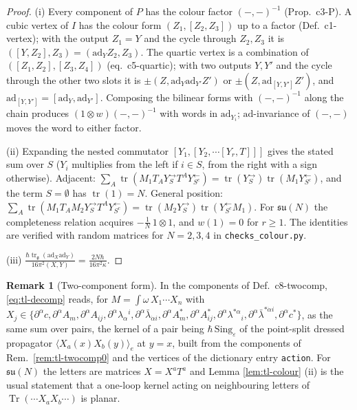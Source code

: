 \documentclass[11pt]{article}
\numberwithin{equation}{section}
\theoremstyle{plain}
\theoremstyle{definition}
\newtheorem{remark}[theorem]{Remark}
\begin{document}
\begin{proof}
(i) Every component of $P$ has the colour factor $(-,-)^{-1}$ (Prop.~c3-P). A cubic vertex of $I$ has the colour form $(Z_1,[Z_2,Z_3])$ up to a factor (Def.~c1-vertex); with the output $Z_1=Y$ and the cycle through $Z_2,Z_3$ it is $([Y,Z_2],Z_3)=(\mathrm{ad}_YZ_2,Z_3)$. The quartic vertex is a combination of $([Z_1,Z_2],[Z_3,Z_4])$ (eq.~c5-quartic); with two outputs $Y,Y'$ and the cycle through the other two slots it is $\pm(Z,\mathrm{ad}_Y\mathrm{ad}_{Y'}Z')$ or $\pm(Z,\mathrm{ad}_{[Y,Y']}Z')$, and $\mathrm{ad}_{[Y,Y']}=[\mathrm{ad}_Y,\mathrm{ad}_{Y'}]$. Composing the bilinear forms with $(-,-)^{-1}$ along the chain produces $(1\otimes w)(-,-)^{-1}$ with words in $\mathrm{ad}_{Y_i}$; $\mathrm{ad}$-invariance of $(-,-)$ moves the word to either factor.

(ii) Expanding the nested commutator $[Y_1,[Y_2,\cdots[Y_r,T]]]$ gives the stated sum over $S$ ($Y_i$ multiplies from the left if $i\in S$, from the right with a sign otherwise). Adjacent: $\sum_A\operatorname{tr}(M_1T_AY_S^{\to}T^AY_{S^c}^{\leftarrow})=\operatorname{tr}(Y_S^{\to})\operatorname{tr}(M_1Y_{S^c}^{\leftarrow})$, and the term $S=\emptyset$ has $\operatorname{tr}(1)=N$. General position: $\sum_A\operatorname{tr}(M_1T_AM_2Y_S^{\to}T^AY_{S^c}^{\leftarrow})=\operatorname{tr}(M_2Y_S^{\to})\operatorname{tr}(Y_{S^c}^{\leftarrow}M_1)$. For $\mathfrak{su}(N)$ the completeness relation acquires $-\frac1N\,1\otimes1$, and $w(1)=0$ for $r\ge1$. The identities are verified with random matrices for $N=2,3,4$ in \texttt{checks\_colour.py}.

(iii) $\frac{\hbar\operatorname{tr}_{\mathfrak g}(\mathrm{ad}_X\mathrm{ad}_Y)}{16\pi^2(X,Y)}=\frac{2N\hbar}{16\pi^2\kappa}$.
\end{proof}

\begin{remark}[Two-component form]
In the components of Def.~c8-twocomp, \eqref{eq:tl-decomp} reads, for $M=\int\omega\,X_1\cdots X_n$ with $X_j\in\{\partial^\alpha c,\partial^\alpha A_m,\partial^\alpha A_{ij},\partial^\alpha\lambda_\alpha{}^i,\partial^\alpha\bar\lambda_{\dot\alpha i},\partial^\alpha A^*_m,\partial^\alpha A^*_{ij},\partial^\alpha\lambda^{*\alpha}{}_i,\partial^\alpha\bar\lambda^{*\dot\alpha i},\partial^\alpha c^*\}$, as the same sum over pairs, the kernel of a pair being $\hbar\,\mathrm{Sing}_\varepsilon$ of the point-split dressed propagator $\langle X_a(x)X_b(y)\rangle_e$ at $y=x$, built from the components of Rem.~\ref{rem:tl-twocomp0} and the vertices of the dictionary entry \texttt{action}. For $\mathfrak{su}(N)$ the letters are matrices $X=X^aT^a$ and Lemma \ref{lem:tl-colour} (ii) is the usual statement that a one-loop kernel acting on neighbouring letters of $\operatorname{Tr}(\cdots X_aX_b\cdots)$ is planar.
\end{remark}
\end{document}
